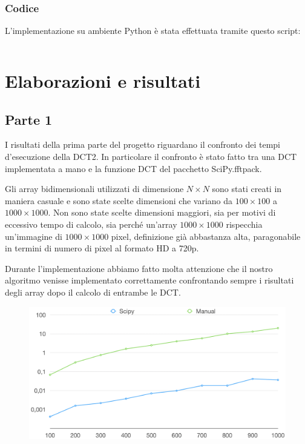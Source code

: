 \documentclass[preprint,12pt]{elsarticle}
\begin{document}
\subsubsection{Codice}
L'implementazione su ambiente Python è stata effettuata tramite questo script:

\inputminted{python}{../Script/script2.py}


\newpage

\section{Elaborazioni e risultati}
\subsection{Parte 1}
I risultati della prima parte del progetto riguardano il confronto dei tempi d'esecuzione della DCT2. In particolare il confronto è stato fatto tra una DCT implementata a mano e la funzione DCT del pacchetto SciPy.fftpack.

Gli array bidimensionali utilizzati di dimensione $N \times N$ sono stati creati in maniera casuale e sono state scelte dimensioni che variano da $100 \times 100$ a $1000 \times 1000$. Non sono state scelte dimensioni maggiori, sia per motivi di eccessivo tempo di calcolo, sia perché un'array $1000 \times 1000$ rispecchia un'immagine di $1000 \times 1000$ pixel, definizione già abbastanza alta, paragonabile in termini di numero di pixel al formato HD a 720p.

Durante l'implementazione abbiamo fatto molta attenzione che il nostro algoritmo venisse implementato correttamente confrontando sempre i risultati degli array dopo il calcolo di entrambe le DCT.

\begin{figure}[H]
	\centering
	\includegraphics[width=\linewidth]{grafico}
\end{figure}
\end{document}
